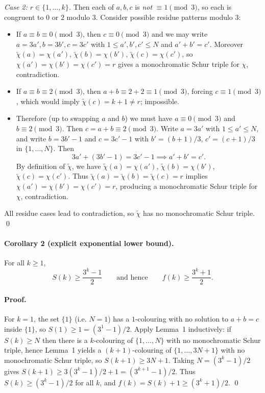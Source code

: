 \emph{Case 2: $r\in\{1,\dots,k\}$.}
Then each of $a,b,c$ is \emph{not} $\equiv 1\pmod 3$, so each is congruent to $0$ or $2$ modulo $3$.
Consider possible residue patterns modulo $3$:
\begin{itemize}
\item If $a\equiv b\equiv 0\pmod 3$, then $c\equiv 0\pmod 3$ and we may write $a=3a',b=3b',c=3c'$ with $1\le a',b',c'\le N$ and $a'+b'=c'$.
Moreover $\widetilde\chi(a)=\chi(a')$, $\widetilde\chi(b)=\chi(b')$, $\widetilde\chi(c)=\chi(c')$, so $\chi(a')=\chi(b')=\chi(c')=r$ gives a monochromatic Schur triple for $\chi$, contradiction.
\item If $a\equiv b\equiv 2\pmod 3$, then $a+b\equiv 2+2\equiv 1\pmod 3$, forcing $c\equiv 1\pmod 3$, which would imply $\widetilde\chi(c)=k+1\ne r$; impossible.
\item Therefore (up to swapping $a$ and $b$) we must have $a\equiv 0\pmod 3$ and $b\equiv 2\pmod 3$. Then $c=a+b\equiv 2\pmod 3$.
Write $a=3a'$ with $1\le a'\le N$, and write $b=3b'-1$ and $c=3c'-1$ with $b'=(b+1)/3$, $c'=(c+1)/3$ in $\{1,\dots,N\}$.
Then
\[3a' + (3b'-1) = 3c'-1 \implies a'+b'=c'.\]
By definition of $\widetilde\chi$, we have $\widetilde\chi(a)=\chi(a')$, $\widetilde\chi(b)=\chi(b')$, $\widetilde\chi(c)=\chi(c')$.
Thus $\widetilde\chi(a)=\widetilde\chi(b)=\widetilde\chi(c)=r$ implies $\chi(a')=\chi(b')=\chi(c')=r$, producing a monochromatic Schur triple for $\chi$, contradiction.
\end{itemize}
All residue cases lead to contradiction, so $\widetilde\chi$ has no monochromatic Schur triple.
\qed

\paragraph{Corollary 2 (explicit exponential lower bound).}
For all $k\ge 1$,
\[S(k)\ge \frac{3^k-1}{2}\qquad\text{and hence}\qquad f(k)\ge \frac{3^k+1}{2}.
\]

\paragraph{Proof.}
For $k=1$, the set $\{1\}$ (i.e. $N=1$) has a $1$-colouring with no solution to $a+b=c$ inside $\{1\}$, so $S(1)\ge 1=(3^1-1)/2$.
Apply Lemma~1 inductively: if $S(k)\ge N$ then there is a $k$-colouring of $\{1,\dots,N\}$ with no monochromatic Schur triple, hence Lemma~1 yields a $(k+1)$-colouring of $\{1,\dots,3N+1\}$ with no monochromatic Schur triple, so $S(k+1)\ge 3N+1$.
Taking $N=(3^k-1)/2$ gives $S(k+1)\ge 3(3^k-1)/2 +1=(3^{k+1}-1)/2$.
Thus $S(k)\ge (3^k-1)/2$ for all $k$, and $f(k)=S(k)+1\ge (3^k+1)/2$.
\qed

